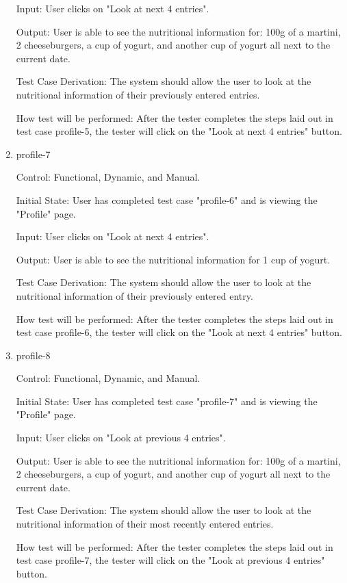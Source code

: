 \documentclass[12pt, titlepage]{article}
\begin{document}
\begin{enumerate}
		Input: User clicks on "Look at next 4 entries".
		
		Output: User is able to see the nutritional information for: 100g of a martini, 2 cheeseburgers, a cup of yogurt, and another cup of yogurt all next to the current date.
		
		Test Case Derivation: The system should allow the user to look at the nutritional information of their previously entered entries.
		
		How test will be performed: After the tester completes the steps laid out in test case profile-5, the tester will click on the "Look at next 4 entries" button.
		
		\item{profile-7\\}
		
		Control: Functional, Dynamic, and Manual.
		
		Initial State: User has completed test case "profile-6" and is viewing the "Profile" page.
		
		Input: User clicks on "Look at next 4 entries".
		
		Output: User is able to see the nutritional information for 1 cup of yogurt.
		
		Test Case Derivation: The system should allow the user to look at the nutritional information of their previously entered entry.
		
		How test will be performed: After the tester completes the steps laid out in test case profile-6, the tester will click on the "Look at next 4 entries" button.
		
		\item{profile-8\\}
		
		Control: Functional, Dynamic, and Manual.
		
		Initial State: User has completed test case "profile-7" and is viewing the "Profile" page.
		
		Input: User clicks on "Look at previous 4 entries".
		
		Output: User is able to see the nutritional information for: 100g of a martini, 2 cheeseburgers, a cup of yogurt, and another cup of yogurt all next to the current date.
		
		Test Case Derivation: The system should allow the user to look at the nutritional information of their most recently entered entries.
		
		How test will be performed: After the tester completes the steps laid out in test case profile-7, the tester will click on the "Look at previous 4 entries" button.
		

\end{enumerate}
\end{document}
